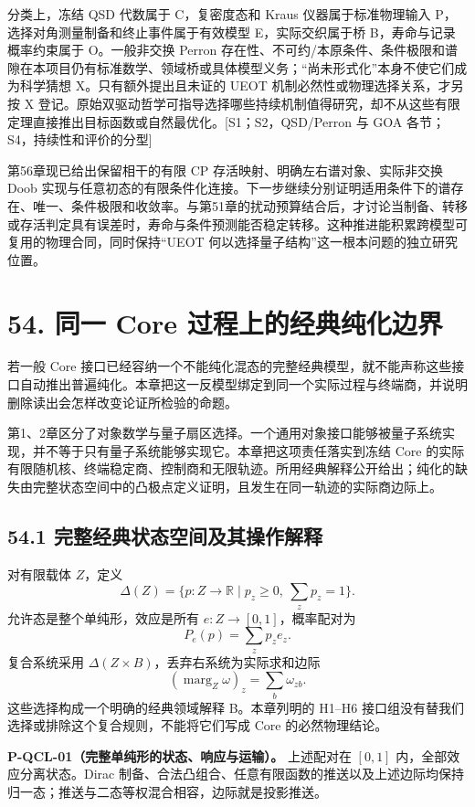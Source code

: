 \documentclass[
  11pt,
  oneside]{book}
\begin{document}
分类上，冻结 QSD 代数属于 C，复密度态和 Kraus 仪器属于标准物理输入
P，选择对角测量制备和终止事件属于有效模型 E，实际交织属于桥
B，寿命与记录概率约束属于 O。一般非交换 Perron
存在性、不可约/本原条件、条件极限和谱隙在本项目仍有标准数学、领域桥或具体模型义务；``尚未形式化''本身不使它们成为科学猜想
X。只有额外提出且未证的 UEOT 机制必然性或物理选择关系，才另按 X
登记。原始双驱动哲学可指导选择哪些持续机制值得研究，却不从这些有限定理直接推出目标函数或自然最优化。{[}S1；S2，QSD/Perron
与 GOA 各节；S4，持续性和评价的分型{]}

第56章现已给出保留相干的有限 CP 存活映射、明确左右谱对象、实际非交换
Doob
实现与任意初态的有限条件化连接。下一步继续分别证明适用条件下的谱存在、唯一、条件极限和收敛率。与第51章的扰动预算结合后，才讨论当制备、转移或存活判定具有误差时，寿命与条件预测能否稳定转移。这种推进能积累跨模型可复用的物理合同，同时保持``UEOT
何以选择量子结构''这一根本问题的独立研究位置。

\chapter{54. 同一 Core 过程上的经典纯化边界}\label{ch-54}\hypertarget{ch-54}{}

若一般 Core
接口已经容纳一个不能纯化混态的完整经典模型，就不能声称这些接口自动推出普遍纯化。本章把这一反模型绑定到同一个实际过程与终端商，并说明删除读出会怎样改变论证所检验的命题。

第1、2章区分了对象数学与量子扇区选择。一个通用对象接口能够被量子系统实现，并不等于只有量子系统能够实现它。本章把这项责任落实到冻结
Core
的实际有限随机核、终端稳定商、控制商和无限轨迹。所用经典解释公开给出；纯化的缺失由完整状态空间中的凸极点定义证明，且发生在同一轨迹的实际商边际上。

\section{54.1 完整经典状态空间及其操作解释}

对有限载体 \(Z\)，定义 \[
\Delta(Z)=\{p:Z\to\mathbb R\mid p_z\ge0,\ \sum_zp_z=1\}.
\] 允许态是整个单纯形，效应是所有 \(e:Z\to[0,1]\)，概率配对为 \[
P_e(p)=\sum_zp_ze_z.
\] 复合系统采用 \(\Delta(Z\times B)\)，丢弃右系统为实际求和边际 \[
(\operatorname{marg}_Z\omega)_z=\sum_b\omega_{zb}.
\] 这些选择构成一个明确的经典领域解释 B。本章列明的 H1--H6
接口组没有替我们选择或排除这个复合规则，不能将它们写成 Core
的必然物理结论。

\protect\hypertarget{p-qcl-01}{}{}

\textbf{P-QCL-01（完整单纯形的状态、响应与运输）。} 上述配对在 \([0,1]\)
内，全部效应分离状态。Dirac
制备、合法凸组合、任意有限函数的推送以及上述边际均保持归一态；推送与二态等权混合相容，边际就是投影推送。
\end{document}
